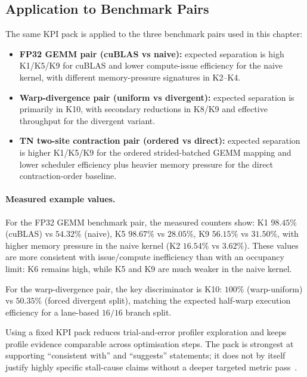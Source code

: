 \subsection{Application to Benchmark Pairs}

The same KPI pack is applied to the three benchmark pairs used in this chapter:

\begin{itemize}
  \item \textbf{FP32 GEMM pair (cuBLAS vs naive):} expected separation is high
  K1/K5/K9 for cuBLAS and lower compute-issue efficiency for the naive kernel,
  with different memory-pressure signatures in K2--K4.
  \item \textbf{Warp-divergence pair (uniform vs divergent):} expected
  separation is primarily in K10, with secondary reductions in K8/K9 and
  effective throughput for the divergent variant.
  \item \textbf{TN two-site contraction pair (ordered vs direct):} expected
  separation is higher K1/K5/K9 for the ordered strided-batched GEMM mapping
  and lower scheduler efficiency plus heavier memory pressure for the direct
  contraction-order baseline.
\end{itemize}

\paragraph{Measured example values.}
For the FP32 GEMM benchmark pair, the measured counters show:
K1 $98.45\%$ (cuBLAS) vs $54.32\%$ (naive),
K5 $98.67\%$ vs $28.05\%$,
K9 $56.15\%$ vs $31.50\%$,
with higher memory pressure in the naive kernel
(K2 $16.54\%$ vs $3.62\%$).
These values are more consistent with issue/compute inefficiency than with an
occupancy limit: K6 remains high, while K5 and K9 are much weaker in the naive
kernel.

For the warp-divergence pair, the key discriminator is K10:
$100\%$ (warp-uniform) vs $50.35\%$ (forced divergent split), matching the
expected half-warp execution efficiency for a lane-based $16/16$ branch split.

Using a fixed KPI pack reduces trial-and-error profiler exploration and keeps
profile evidence comparable across optimisation steps. The pack is strongest at
supporting ``consistent with'' and ``suggests'' statements; it does not by
itself justify highly specific stall-cause claims without a deeper targeted
metric pass~\cite{nvidia-nsight-compute-profiling-guide}.

